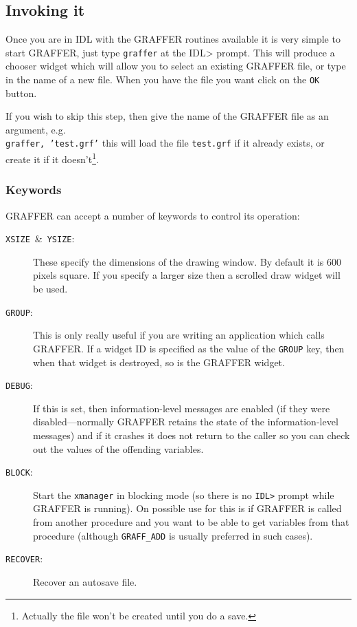 \documentclass[11pt,twoside,english]{article}
\begin{document}
\subsection{Invoking it}

Once you are in IDL with the GRAFFER routines available it is very
simple to start GRAFFER, just type \texttt{graffer} at the IDL> prompt.
This will produce a chooser widget which will allow you to select an
existing GRAFFER file, or type in the name of a new file. When you have
the file you want click on the \texttt{OK} button.

If you wish to skip this step, then give the name of the GRAFFER file
as an argument, e.g. \texttt{}~\\
\texttt{graffer,~'test.grf'} this will load the file \texttt{test.grf}
if it already exists, or create it if it doesn't\footnote{Actually the
  file won't be created until you do a save.}.


\subsubsection{Keywords}

GRAFFER can accept a number of keywords to control its operation:

\begin{description}

\item [\texttt{XSIZE}~\&~\texttt{YSIZE}:]These specify the dimensions
  of the drawing window. By default it is 600 pixels square. If you
  specify a larger size then a scrolled draw widget will be used.

\item [\texttt{GROUP}:]This is only really useful if you are writing an
  application which calls GRAFFER. If a widget ID is specified as the
  value of the \texttt{GROUP} key, then when that widget is destroyed,
  so is the GRAFFER widget.
\item [\texttt{DEBUG}:]If this is set, then information-level messages
  are enabled (if they were disabled---normally GRAFFER retains the
  state of the information-level messages) and if it crashes it does
  not return to the caller so you can check out the values of the
  offending variables.
\item[\texttt{BLOCK}:] Start the \texttt{xmanager} in blocking mode (so
  there is no \texttt{IDL>} prompt while GRAFFER is running). On
  possible use for this is if GRAFFER is called from another procedure
  and you want to be able to get variables from that procedure
  (although \texttt{GRAFF\_ADD} is usually preferred in such cases).
\item[\texttt{RECOVER}:] Recover an autosave file.
\end{description}
\end{document}
